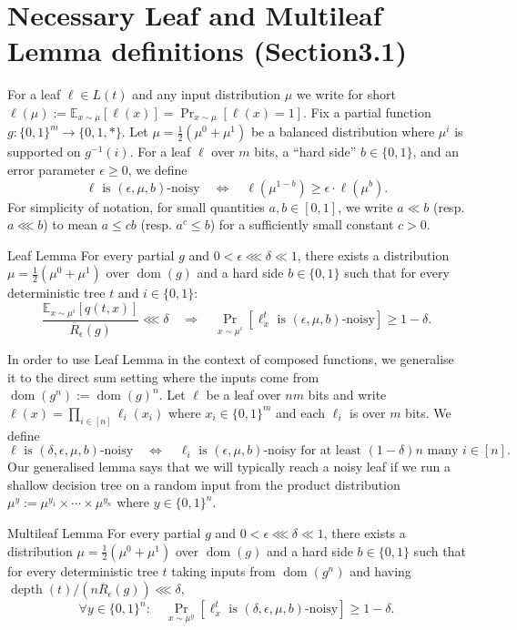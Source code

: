 \section*{Necessary Leaf and Multileaf Lemma definitions (Section3.1)}
For a leaf $\ell\in L(t)$ and any input distribution $\mu$ we write for short $\ell(\mu):=\mathbb E_{x\sim\mu}[\ell(x)]=\Pr_{x\sim\mu}[\ell(x)=1]$.
Fix a partial function $g:\{0,1\}^m\to\{0,1,*\}$. Let $\mu=\frac12(\mu^0+\mu^1)$ be a balanced distribution where $\mu^i$ is supported on $g^{-1}(i)$. For a leaf $\ell$ over $m$ bits, a ``hard side'' $b\in\{0,1\}$, and an error parameter $\epsilon\ge0$, we define
\[\ell\text{ is }(\epsilon,\mu,b)\text{-noisy}\quad\Longleftrightarrow\quad\ell(\mu^{1-b})\ge\epsilon\cdot\ell(\mu^b).\]
For simplicity of notation, for small quantities $a,b\in[0,1]$, we write $a\ll b$ (resp. $a\lll b$) to mean $a\le cb$ (resp. $a^c\le b$) for a sufficiently small constant $c>0$.
\begin{authorclaim}{Leaf Lemma}
For every partial $g$ and $0<\epsilon\lll\delta\ll1$, there exists a distribution $\mu=\frac12(\mu^0+\mu^1)$ over $\operatorname{dom}(g)$ and a hard side $b\in\{0,1\}$ such that for every deterministic tree $t$ and $i\in\{0,1\}$:
\[\frac{\mathbb E_{x\sim\mu^i}[q(t,x)]}{\overline R_\epsilon(g)}\lll\delta\quad\Longrightarrow\quad\Pr_{x\sim\mu^i}[\ell_x^t\text{ is }(\epsilon,\mu,b)\text{-noisy}]\ge1-\delta.\]
\end{authorclaim}
In order to use Leaf Lemma in the context of composed functions, we generalise it to the direct sum setting where the inputs come from $\operatorname{dom}(g^n):=\operatorname{dom}(g)^n$. Let $\ell$ be a leaf over $nm$ bits and write $\ell(x)=\prod_{i\in[n]}\ell_i(x_i)$ where $x_i\in\{0,1\}^m$ and each $\ell_i$ is over $m$ bits. We define
\[\ell\text{ is }(\delta,\epsilon,\mu,b)\text{-noisy}\quad\Longleftrightarrow\quad\ell_i\text{ is }(\epsilon,\mu,b)\text{-noisy for at least }(1-\delta)n\text{ many }i\in[n].\]
Our generalised lemma says that we will typically reach a noisy leaf if we run a shallow decision tree on a random input from the product distribution $\mu^y:=\mu^{y_1}\times\cdots\times\mu^{y_n}$ where $y\in\{0,1\}^n$.
\begin{authorclaim}{Multileaf Lemma}
For every partial $g$ and $0<\epsilon\lll\delta\ll1$, there exists a distribution $\mu=\frac12(\mu^0+\mu^1)$ over $\operatorname{dom}(g)$ and a hard side $b\in\{0,1\}$ such that for every deterministic tree $t$ taking inputs from $\operatorname{dom}(g^n)$ and having $\operatorname{depth}(t)/(n\overline R_\epsilon(g))\lll\delta$,
\[\forall y\in\{0,1\}^n:\quad\Pr_{x\sim\mu^y}[\ell_x^t\text{ is }(\delta,\epsilon,\mu,b)\text{-noisy}]\ge1-\delta.\]
\end{authorclaim}
